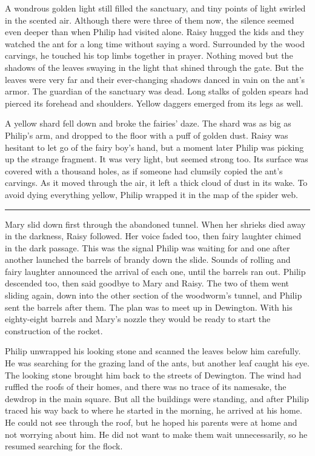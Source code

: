 \documentclass[10pt]{memoir}
\renewcommand{\pfbreakdisplay}{\bigskip \ding{166} \bigskip}
\newcommand{\secbreak}{\fancybreak{\pfbreakdisplay}}
\begin{document}
A wondrous golden light still filled the sanctuary, and tiny points of light
swirled in the scented air. Although there were three of them now, the silence
seemed even deeper than when Philip had visited alone. Raisy hugged the kids
and they watched the ant for a long time without saying a word. Surrounded by
the wood carvings, he touched his top limbs together in prayer. Nothing moved
but the shadows of the leaves swaying in the light that shined through the
gate. But the leaves were very far and their ever-changing shadows danced in
vain on the ant's armor. The guardian of the sanctuary was dead. Long stalks of
golden spears had pierced its forehead and shoulders. Yellow daggers emerged
from its legs as well.

A yellow shard fell down and broke the fairies' daze. The shard was as big as
Philip's arm, and dropped to the floor with a puff of golden dust. Raisy was
hesitant to let go of the fairy boy's hand, but a moment later Philip was
picking up the strange fragment. It was very light, but seemed strong too. Its
surface was covered with a thousand holes, as if someone had clumsily copied
the ant's carvings. As it moved through the air, it left a thick cloud of dust
in its wake. To avoid dying everything yellow, Philip wrapped it in the map of
the spider web.

\secbreak

Mary slid down first through the abandoned tunnel. When her shrieks died away
in the darkness, Raisy followed. Her voice faded too, then fairy laughter
chimed in the dark passage. This was the signal Philip was waiting for and one
after another launched the barrels of brandy down the slide. Sounds of rolling
and fairy laughter announced the arrival of each one, until the barrels ran
out. Philip descended too, then said goodbye to Mary and Raisy. The two of them
went sliding again, down into the other section of the woodworm's tunnel, and
Philip sent the barrels after them. The plan was to meet up in Dewington. With
his eighty-eight barrels and Mary's nozzle they would be ready to start the
construction of the rocket.

Philip unwrapped his looking stone and scanned the leaves below him carefully.
He was searching for the grazing land of the ants, but another leaf caught his
eye. The looking stone brought him back to the streets of Dewington. The wind
had ruffled the roofs of their homes, and there was no trace of its namesake,
the dewdrop in the main square. But all the buildings were standing, and after
Philip traced his way back to where he started in the morning, he arrived at
his home. He could not see through the roof, but he hoped his parents were at
home and not worrying about him. He did not want to make them wait
unnecessarily, so he resumed searching for the flock.
\end{document}
